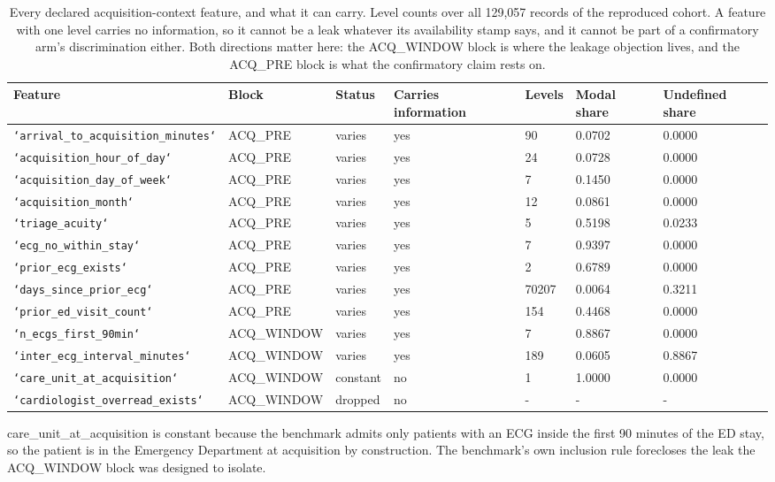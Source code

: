 \begin{table}[t]
\centering
\small
\caption{Every declared acquisition-context feature, and what it can carry. Level counts over all 129,057 records of the reproduced cohort. A feature with one level carries no information, so it cannot be a leak whatever its availability stamp says, and it cannot be part of a confirmatory arm's discrimination either. Both directions matter here: the ACQ\_WINDOW block is where the leakage objection lives, and the ACQ\_PRE block is what the confirmatory claim rests on.}
\label{tab:blocks}
\begin{tabular}{lllllll}
\toprule
Feature & Block & Status & Carries information & Levels & Modal share & Undefined share \\
\midrule
\texttt{`arrival\_to\_acquisition\_minutes`} & ACQ\_PRE & varies & yes & 90 & 0.0702 & 0.0000 \\
\texttt{`acquisition\_hour\_of\_day`} & ACQ\_PRE & varies & yes & 24 & 0.0728 & 0.0000 \\
\texttt{`acquisition\_day\_of\_week`} & ACQ\_PRE & varies & yes & 7 & 0.1450 & 0.0000 \\
\texttt{`acquisition\_month`} & ACQ\_PRE & varies & yes & 12 & 0.0861 & 0.0000 \\
\texttt{`triage\_acuity`} & ACQ\_PRE & varies & yes & 5 & 0.5198 & 0.0233 \\
\texttt{`ecg\_no\_within\_stay`} & ACQ\_PRE & varies & yes & 7 & 0.9397 & 0.0000 \\
\texttt{`prior\_ecg\_exists`} & ACQ\_PRE & varies & yes & 2 & 0.6789 & 0.0000 \\
\texttt{`days\_since\_prior\_ecg`} & ACQ\_PRE & varies & yes & 70207 & 0.0064 & 0.3211 \\
\texttt{`prior\_ed\_visit\_count`} & ACQ\_PRE & varies & yes & 154 & 0.4468 & 0.0000 \\
\texttt{`n\_ecgs\_first\_90min`} & ACQ\_WINDOW & varies & yes & 7 & 0.8867 & 0.0000 \\
\texttt{`inter\_ecg\_interval\_minutes`} & ACQ\_WINDOW & varies & yes & 189 & 0.0605 & 0.8867 \\
\texttt{`care\_unit\_at\_acquisition`} & ACQ\_WINDOW & constant & no & 1 & 1.0000 & 0.0000 \\
\texttt{`cardiologist\_overread\_exists`} & ACQ\_WINDOW & dropped & no & - & - & - \\
\bottomrule
\end{tabular}
\par\footnotesize care\_unit\_at\_acquisition is constant because the benchmark admits only patients with an ECG inside the first 90 minutes of the ED stay, so the patient is in the Emergency Department at acquisition by construction. The benchmark's own inclusion rule forecloses the leak the ACQ\_WINDOW block was designed to isolate.

\end{table}

